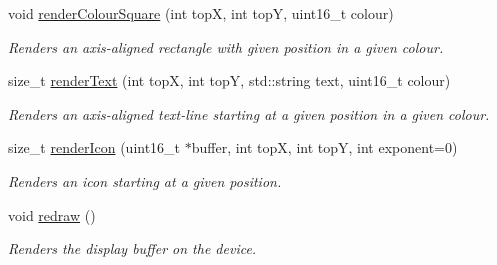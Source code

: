 \begin{DoxyCompactItemize}
void \mbox{\hyperlink{classDisplay_a94ad8f357b5fffdd4711a593e29003a8}{render\+Colour\+Square}} (int topX, int topY, uint16\+\_\+t colour)
\begin{DoxyCompactList}\small\item\em Renders an axis-\/aligned rectangle with given position in a given colour. \end{DoxyCompactList}\item 
size\+\_\+t \mbox{\hyperlink{classDisplay_a0e1bcaa77e45765f710a28130a34473d}{render\+Text}} (int topX, int topY, std\+::string text, uint16\+\_\+t colour)
\begin{DoxyCompactList}\small\item\em Renders an axis-\/aligned text-\/line starting at a given position in a given colour. \end{DoxyCompactList}\item 
size\+\_\+t \mbox{\hyperlink{classDisplay_a7e1b0ac97b561093e8f1993d7743c095}{render\+Icon}} (uint16\+\_\+t $\ast$buffer, int topX, int topY, int exponent=0)
\begin{DoxyCompactList}\small\item\em Renders an icon starting at a given position. \end{DoxyCompactList}\item 
\mbox{\label{classDisplay_a4fe6059ab67f9a11469ea53f4a5ddb0d}} 
void \mbox{\hyperlink{classDisplay_a4fe6059ab67f9a11469ea53f4a5ddb0d}{redraw}} ()
\begin{DoxyCompactList}\small\item\em Renders the display buffer on the device. \end{DoxyCompactList}\end{DoxyCompactItemize}
